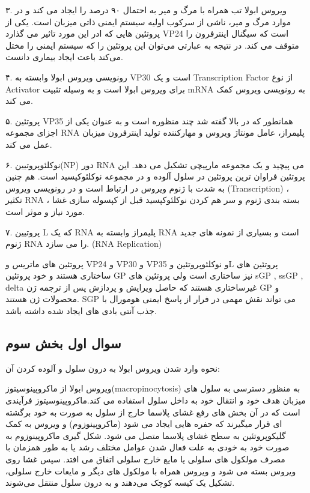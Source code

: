 \documentclass[11pt]{article}
\begin{document}
۳. ویروس ابولا  تب همراه با  مرگ و میر به احتمال ۹۰ درصد را ایجاد می کند و در موارد مرگ و میر،  ناشی از سرکوب اولیه سیستم ایمنی ذاتی میزبان است. یکی از پروتئین هایی که ادر این مورد تاثیر می گذارد VP24 است که سیگنال اینترفرون را متوقف می کند. در نتیجه به عبارتی می‌توان این پروتئین را که سیستم ایمنی را مختل می‌کند باعث ایجاد بیماری دانست.

۴. رونویسی ویروس ابولا وابسته به VP30 است و یک Transcription Factor از نوع Activator برای ویروس ابولا است و به وسیله تثبیت mRNA به رونویسی ویروس کمک می کند.

۵. پروتئین VP35 همانطور که در بالا گفته شد چند منظوره است و به عنوان یکی از اجزای مجموعه RNA پلیمراز، عامل مونتاژ ویروس و مهارکننده تولید اینترفرون میزبان عمل می کند.

۶. نوکلئوپروتیین(NP)  دور RNA می پیچید و یک مجموعه مارپیچی تشکیل می دهد. این پروتئین فراوان ترین پروتئین در سلول آلوده و در مجموعه نوکلئوکپسید است. هم چنین  به شدت با ژنوم ویروس در ارتباط است و در رونویسی ویروس (Transcription) ،  تکثیر RNA ، بسته بندی ژنوم و سر هم کردن نوکلئوکپسید قبل از کپسوله سازی غشا مورد نیاز و موثر است.

۷. پروتیین L  که یک RNA پلیمراز وابسته به RNA است و بسیاری از نمونه های جدید ژنوم RNA را می سازد. (RNA Replication)

پروتئین های ماتریس و VP24 و VP30 و VP35 و نوکلئوپروتئین وL  پروتئین های ساختاری هستند و خود پروتئین GP نیز ساختاری است ولی پروتئین های sGP , ssGP , delta غیرساختاری هستند که حاصل ویرایش و پردازش پس از ترجمه ژن GP  و محصولات ژن هستند. SGP می تواند نقش مهمی در فرار از پاسخ ایمنی هومورال با جذب آنتی بادی های ایجاد شده داشته باشد.


\subsection{سوال اول بخش سوم}

 نحوه وارد شدن ویروس ابولا به درون سلول و آلوده کردن آن:

ویروس ابولا از ماکروپینوسیتوز(macropinocytosis)  به منظور دسترسی به سلول های میزبان هدف خود و انتقال خود به داخل سلول استفاده می کند.ماکروپینوسیتوز فرآیندی است که در آن بخش های رفع غشای پلاسما خارج از سلول به صورت به خود برگشته ای قرار میگیرند که حفره هایی ایجاد می شود (ماکروپینوزوم)  و ویروس به کمک گلیکوپروتئین به سطح غشای پلاسما متصل می شود. شکل گیری ماکروپینوزوم به صورت خود به خودی به علت فعال شدن عوامل مختلف رشد یا به طور همزمان با مصرف مولکول های سلولی یا مایع خارج سلولی اتفاق می افتد. سپس غشا روی ویروس بسته می شود و ویروس همراه با مولکول های دیگر و مایعات خارج سلولی، تشکیل یک کیسه کوچک می‌دهند و به درون سلول منتقل می‌شوند.
\end{document}
